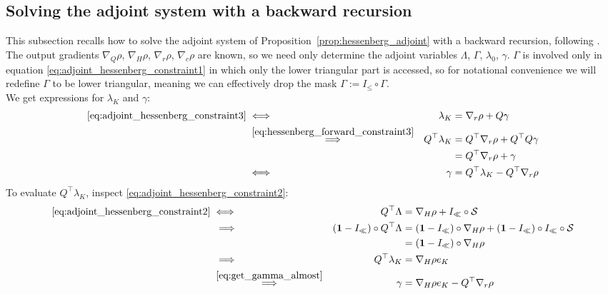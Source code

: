 \documentclass[a4paper,12pt]{article}
\theoremstyle{definition}
\begin{document}
\subsection{Solving the adjoint system with a backward recursion}\label{app:solving_adjoint_system}
This subsection recalls how to solve the adjoint system of Proposition~\ref{prop:hessenberg_adjoint} with a backward recursion, following \citet{kraemer2024gradients}.
The output gradients $\nabla_Q\rho$, $\nabla_H\rho$, $\nabla_r\rho$, $\nabla_c\rho$ are known, so we need only determine the adjoint variables $\Lambda$, $\Gamma$, $\lambda_0$, $\gamma$. $\Gamma$ is involved only in equation \eqref{eq:adjoint_hessenberg_constraint1} in which only the lower triangular part is accessed, so for notational convenience we will redefine $\Gamma$ to be lower triangular, meaning we can effectively drop the mask $\Gamma := I_{\leq} \circ \Gamma$.
\\
We get expressions for $\lambda_K$ and $\gamma$:
\begin{align}
    \eqref{eq:adjoint_hessenberg_constraint3} & \iff & \lambda_K &= \nabla_r \rho + Q \gamma \label{eq:get_last_lambda}
    \\
    & \;\overset{\eqref{eq:hessenberg_forward_constraint3}}{\implies} &Q^\top \lambda_K &= Q^\top \nabla_r \rho + Q^\top Q \gamma \nonumber
    \\ 
    &&&= Q^\top \nabla_r \rho + \gamma \nonumber
    \\ 
    & \iff & \gamma &= Q^\top \lambda_K - Q^\top \nabla_r \rho \label{eq:get_gamma_almost}
\end{align}
To evaluate $Q^\top \lambda_K$, inspect \eqref{eq:adjoint_hessenberg_constraint2}:
\begin{align}
    \eqref{eq:adjoint_hessenberg_constraint2} & \iff &Q^\top \Lambda &= \nabla_{H} \rho + I_{\ll} \circ \mathcal{S} \nonumber
    \\
    & \;\implies & (\mathbf{1} - I_{\ll}) \circ Q^\top \Lambda &= (\mathbf{1} - I_{\ll}) \circ \nabla_{H} \rho + (\mathbf{1} - I_{\ll}) \circ I_{\ll} \circ \mathcal{S} \nonumber
    \\ 
    &&&= (\mathbf{1} - I_{\ll}) \circ \nabla_{H} \rho \label{eq:get_lambda_in_Q_coords}
    \\
    & \;\implies & Q^\top \lambda_K &= \nabla_{H} \rho e_K \nonumber
    \\
    &\;\overset{\eqref{eq:get_gamma_almost}}{\implies} &  \gamma &= \nabla_{H} \rho e_K - Q^\top \nabla_r \rho \label{eq:get_gamma}
\end{align}
\end{document}
